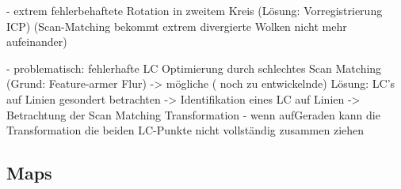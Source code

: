 - extrem fehlerbehaftete Rotation in zweitem Kreis (Lösung: Vorregistrierung ICP)
(Scan-Matching bekommt extrem divergierte Wolken nicht mehr aufeinander)

- problematisch: fehlerhafte LC Optimierung durch schlechtes Scan Matching (Grund: Feature-armer Flur) -> mögliche ( noch zu entwickelnde) Lösung: LC's auf Linien gesondert betrachten -> Identifikation eines LC auf Linien -> Betrachtung der Scan Matching Transformation - wenn aufGeraden kann die Transformation die beiden LC-Punkte nicht vollständig zusammen ziehen

\subsection{Maps}


